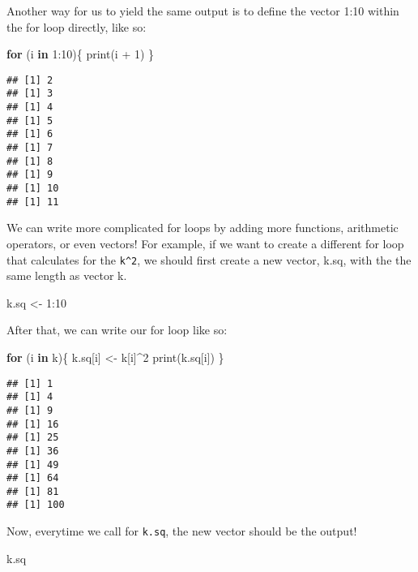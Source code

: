 \documentclass[
]{book}
\newenvironment{Shaded}{\begin{snugshade}}{\end{snugshade}}
\newcommand{\ControlFlowTok}[1]{\textcolor[rgb]{0.13,0.29,0.53}{\textbf{#1}}}
\newcommand{\DecValTok}[1]{\textcolor[rgb]{0.00,0.00,0.81}{#1}}
\newcommand{\FunctionTok}[1]{\textcolor[rgb]{0.00,0.00,0.00}{#1}}
\newcommand{\NormalTok}[1]{#1}
\newcommand{\OtherTok}[1]{\textcolor[rgb]{0.56,0.35,0.01}{#1}}
\newcommand{\SpecialCharTok}[1]{\textcolor[rgb]{0.00,0.00,0.00}{#1}}
\begin{document}
Another way for us to yield the same output is to define the vector 1:10 within the for loop directly, like so:

\begin{Shaded}
\begin{Highlighting}[]
\ControlFlowTok{for}\NormalTok{ (i }\ControlFlowTok{in} \DecValTok{1}\SpecialCharTok{:}\DecValTok{10}\NormalTok{)\{}
  \FunctionTok{print}\NormalTok{(i }\SpecialCharTok{+} \DecValTok{1}\NormalTok{)}
\NormalTok{\}}
\end{Highlighting}
\end{Shaded}

\begin{verbatim}
## [1] 2
## [1] 3
## [1] 4
## [1] 5
## [1] 6
## [1] 7
## [1] 8
## [1] 9
## [1] 10
## [1] 11
\end{verbatim}

We can write more complicated for loops by adding more functions, arithmetic operators, or even vectors! For example, if we want to create a different for loop that calculates for the \texttt{k\^{}2}, we should first create a new vector, k.sq, with the the same length as vector k.

\begin{Shaded}
\begin{Highlighting}[]
\NormalTok{k.sq }\OtherTok{\textless{}{-}} \DecValTok{1}\SpecialCharTok{:}\DecValTok{10}
\end{Highlighting}
\end{Shaded}

After that, we can write our for loop like so:

\begin{Shaded}
\begin{Highlighting}[]
\ControlFlowTok{for}\NormalTok{ (i }\ControlFlowTok{in}\NormalTok{ k)\{    }
\NormalTok{  k.sq[i] }\OtherTok{\textless{}{-}}\NormalTok{ k[i]}\SpecialCharTok{\^{}}\DecValTok{2}
  \FunctionTok{print}\NormalTok{(k.sq[i])}
\NormalTok{\}}
\end{Highlighting}
\end{Shaded}

\begin{verbatim}
## [1] 1
## [1] 4
## [1] 9
## [1] 16
## [1] 25
## [1] 36
## [1] 49
## [1] 64
## [1] 81
## [1] 100
\end{verbatim}

Now, everytime we call for \texttt{k.sq}, the new vector should be the output!

\begin{Shaded}
\begin{Highlighting}[]
\NormalTok{k.sq}
\end{Highlighting}
\end{Shaded}
\end{document}
